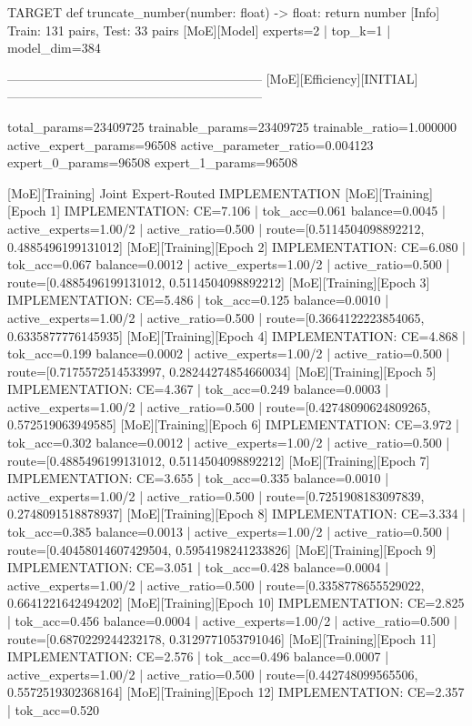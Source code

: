 TARGET
def truncate_number(number: float) -> float: return number %
[Info] Train: 131 pairs, Test: 33 pairs
[MoE][Model] experts=2 | top_k=1 | model_dim=384

------------------------------------------------------------
[MoE][Efficiency][INITIAL]
------------------------------------------------------------

total_params=23409725
trainable_params=23409725
trainable_ratio=1.000000
active_expert_params=96508
active_parameter_ratio=0.004123
expert_0_params=96508
expert_1_params=96508

[MoE][Training] Joint Expert-Routed IMPLEMENTATION
[MoE][Training][Epoch 1] IMPLEMENTATION: CE=7.106 | tok_acc=0.061
balance=0.0045 | active_experts=1.00/2 | active_ratio=0.500 | route=[0.5114504098892212, 0.4885496199131012]
[MoE][Training][Epoch 2] IMPLEMENTATION: CE=6.080 | tok_acc=0.067
balance=0.0012 | active_experts=1.00/2 | active_ratio=0.500 | route=[0.4885496199131012, 0.5114504098892212]
[MoE][Training][Epoch 3] IMPLEMENTATION: CE=5.486 | tok_acc=0.125
balance=0.0010 | active_experts=1.00/2 | active_ratio=0.500 | route=[0.3664122223854065, 0.6335877776145935]
[MoE][Training][Epoch 4] IMPLEMENTATION: CE=4.868 | tok_acc=0.199
balance=0.0002 | active_experts=1.00/2 | active_ratio=0.500 | route=[0.7175572514533997, 0.28244274854660034]
[MoE][Training][Epoch 5] IMPLEMENTATION: CE=4.367 | tok_acc=0.249
balance=0.0003 | active_experts=1.00/2 | active_ratio=0.500 | route=[0.42748090624809265, 0.572519063949585]
[MoE][Training][Epoch 6] IMPLEMENTATION: CE=3.972 | tok_acc=0.302
balance=0.0012 | active_experts=1.00/2 | active_ratio=0.500 | route=[0.4885496199131012, 0.5114504098892212]
[MoE][Training][Epoch 7] IMPLEMENTATION: CE=3.655 | tok_acc=0.335
balance=0.0010 | active_experts=1.00/2 | active_ratio=0.500 | route=[0.7251908183097839, 0.2748091518878937]
[MoE][Training][Epoch 8] IMPLEMENTATION: CE=3.334 | tok_acc=0.385
balance=0.0013 | active_experts=1.00/2 | active_ratio=0.500 | route=[0.40458014607429504, 0.5954198241233826]
[MoE][Training][Epoch 9] IMPLEMENTATION: CE=3.051 | tok_acc=0.428
balance=0.0004 | active_experts=1.00/2 | active_ratio=0.500 | route=[0.3358778655529022, 0.6641221642494202]
[MoE][Training][Epoch 10] IMPLEMENTATION: CE=2.825 | tok_acc=0.456
balance=0.0004 | active_experts=1.00/2 | active_ratio=0.500 | route=[0.6870229244232178, 0.3129771053791046]
[MoE][Training][Epoch 11] IMPLEMENTATION: CE=2.576 | tok_acc=0.496
balance=0.0007 | active_experts=1.00/2 | active_ratio=0.500 | route=[0.442748099565506, 0.5572519302368164]
[MoE][Training][Epoch 12] IMPLEMENTATION: CE=2.357 | tok_acc=0.520
